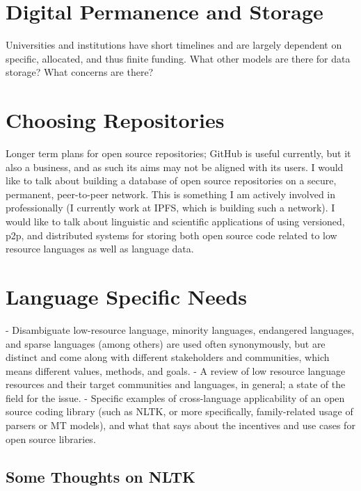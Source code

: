 \documentclass[10pt, a4paper]{article}
\begin{document}

\section{Digital Permanence and Storage}

Universities and institutions have short timelines and are largely dependent on specific, allocated, and thus finite funding. What other models are there for data storage? What concerns are there?

\section{Choosing Repositories}

Longer term plans for open source repositories; GitHub is useful currently, but it also a business, and as such its aims may not be aligned with its users. I would like to talk about building a database of open source repositories on a secure, permanent, peer-to-peer network. This is something I am actively involved in professionally (I currently work at IPFS, which is building such a network). I would like to talk about linguistic and scientific applications of using versioned, p2p, and distributed systems for storing both open source code related to low resource languages as well as language data.

\section{Language Specific Needs}

- Disambiguate low-resource language, minority languages, endangered languages, and sparse languages (among others) are used often synonymously, but are distinct and come along with different stakeholders and communities, which means different values, methods, and goals.
- A review of low resource language resources and their target communities and languages, in general; a state of the field for the issue.
- Specific examples of cross-language applicability of an open source coding library (such as NLTK, or more specifically, family-related usage of parsers or MT models), and what that says about the incentives and use cases for open source libraries.

\subsection{Some Thoughts on NLTK}
\end{document}
